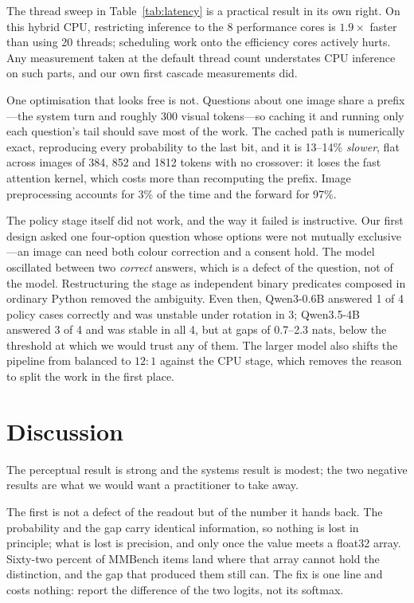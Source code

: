 \documentclass[10pt,twocolumn]{article}
\begin{document}
The thread sweep in Table~\ref{tab:latency} is a practical result in its own
right. On this hybrid CPU, restricting inference to the 8 performance cores is
$1.9\times$ faster than using 20 threads; scheduling work onto the efficiency
cores actively hurts. Any measurement taken at the default thread count
understates CPU inference on such parts, and our own first cascade measurements
did.

One optimisation that looks free is not. Questions about one image share a
prefix---the system turn and roughly 300 visual tokens---so caching it and
running only each question's tail should save most of the work. The cached path
is numerically exact, reproducing every probability to the last bit, and it is
13--14\% \emph{slower}, flat across images of 384, 852 and 1812 tokens with no
crossover: it loses the fast attention kernel, which costs more than
recomputing the prefix. Image preprocessing accounts for 3\% of the time and
the forward for 97\%.

The policy stage itself did not work, and the way it failed is instructive. Our
first design asked one four-option question whose options were not mutually
exclusive---an image can need both colour correction and a consent hold. The
model oscillated between two \emph{correct} answers, which is a defect of the
question, not of the model. Restructuring the stage as independent binary
predicates composed in ordinary Python removed the ambiguity. Even then,
Qwen3-0.6B answered 1 of 4 policy cases correctly and was unstable under
rotation in 3; Qwen3.5-4B answered 3 of 4 and was stable in all 4, but at gaps
of 0.7--2.3 nats, below the threshold at which we would trust any of them. The
larger model also shifts the pipeline from balanced to $12{:}1$ against the CPU
stage, which removes the reason to split the work in the first place.

\section{Discussion}

The perceptual result is strong and the systems result is modest; the two
negative results are what we would want a practitioner to take away.

The first is not a defect of the readout but of the number it hands back. The
probability and the gap carry identical information, so nothing is lost in
principle; what is lost is precision, and only once the value meets a float32
array. Sixty-two percent of MMBench items land where that array cannot hold the
distinction, and the gap that produced them still can. The fix is one line and
costs nothing: report the difference of the two logits, not its softmax.
\end{document}
